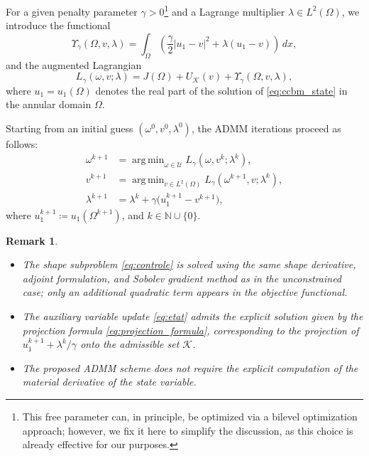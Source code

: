 \documentclass[a4paper,11pt]{article}
\newtheorem{remark}{Remark}
\DeclareMathOperator*{\argmin}{arg\,min}
\newcommand{\ur}{u_{1}}
\newcommand{\intO}[1]{\int_{\varOmega}{#1}{\, {d}{x}}}
\newcommand{\ADMMpara}{\gamma}
\begin{document}
For a given penalty parameter $\ADMMpara>0$\footnote{This free parameter can, in principle, be optimized via a bilevel optimization approach; however, we fix it here to simplify the discussion, as this choice is already effective for our purposes.} and a Lagrange multiplier
$\lambda \in L^{2}(\varOmega)$, we introduce the functional
\[
	\Upsilon_{\ADMMpara}(\varOmega, v, \lambda)
	= \intO{ \left( \frac{\ADMMpara}{2}  |\ur- v|^2 + \lambda (\ur - v) \right) },
\]
and the augmented Lagrangian
\begin{equation}
\label{eq:augmented_lagrangian}
	{L}_{\ADMMpara}(\omega, v; \lambda)
	=
	J({\varOmega})
	+
	U_{\mathcal{K}}(v)
	+
	\Upsilon_{\ADMMpara}(\varOmega, v, \lambda),
\end{equation}
where $\ur = \ur(\varOmega)$ denotes the real part of the solution of \eqref{eq:ccbm_state} in the annular domain $\varOmega$.

Starting from an initial guess $(\omega^{0}, v^{0}, \lambda^{0})$, the ADMM iterations proceed as follows:
\begin{align}
    \omega^{k+1}
    &= \argmin_{\omega \in \mathcal{U}}
    {L}_{\ADMMpara}(\omega, v^{k}; \lambda^{k}),
    \label{eq:controle}\tag{SP1}
    \\
    v^{k+1}
    &= \argmin_{v \in L^{2}(\varOmega)}
    {L}_{\ADMMpara}(\omega^{k+1}, v; \lambda^{k}),
    \label{eq:etat}\tag{SP2}
    \\
    \lambda^{k+1}
    &= \lambda^{k} + \ADMMpara \big(\ur^{k+1} - v^{k+1}\big),
    \label{eq:parametre1}\tag{SP3}
\end{align}
where $\ur^{k+1} \coloneqq \ur(\varOmega^{k+1})$, and $k \in \mathbb{N} \cup \{0\}$.

\begin{remark}
\begin{itemize}
\item The shape subproblem \eqref{eq:controle} is solved using the same shape derivative,
adjoint formulation, and Sobolev gradient method as in the unconstrained case; only an additional
quadratic term appears in the objective functional.
\item The auxiliary variable update \eqref{eq:etat} admits the explicit solution given by the projection formula \eqref{eq:projection_formula}, corresponding to the projection of $\ur^{k+1} + \lambda^{k}/\ADMMpara$ onto the admissible set $\mathcal{K}$.
\item The proposed ADMM scheme does not require the explicit computation of the material
derivative of the state variable.
\end{itemize}
\end{remark}
\end{document}
